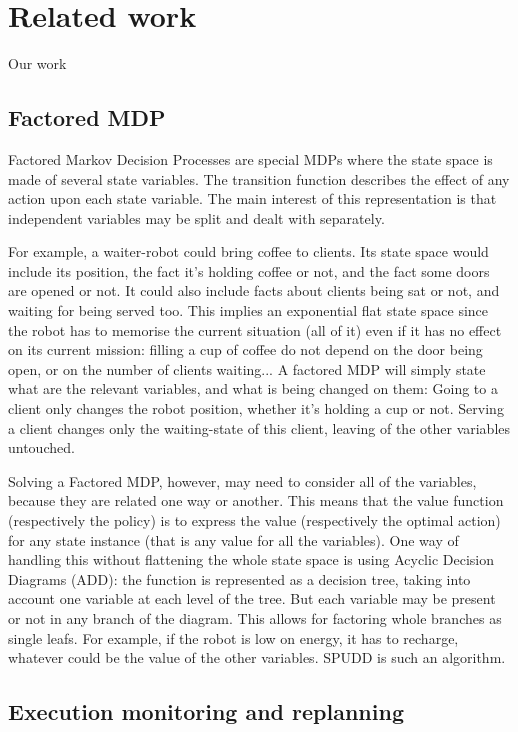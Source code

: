 \section{Related work}


Our work 

\subsection{Factored MDP}

Factored Markov Decision Processes \cite{BoDeGo00} are special MDPs where the state space is made of several state variables. The transition function describes the effect of any action upon each state variable. The main interest of this representation is that independent variables may be split and dealt with separately.

For example, a waiter-robot could bring coffee to clients. Its state space would include its position, the fact it's holding coffee or not, and the fact some doors are opened or not. It could also include facts about clients being sat or not, and waiting for being served too. This implies an exponential flat state space since the robot has to memorise the current situation (all of it) even if it has no effect on its current mission: filling a cup of coffee do not depend on the door being open, or on the number of clients waiting...
A factored MDP will simply state what are the relevant variables, and what is being changed on them: Going to a client only changes the robot position, whether it's holding a cup or not. Serving a client changes only the waiting-state of this client, leaving of the other variables untouched.

Solving a Factored MDP, however, may need to consider all of the variables, because they are related one way or another. This means that the value function (respectively the policy) is to express the value (respectively the optimal action) for any state instance (that is any value for all the variables). One way of handling this without flattening the whole state space is using Acyclic Decision Diagrams (ADD): the function is represented as a decision tree, taking into account one variable at each level of the tree. But each variable may be present or not in any branch of the diagram. This allows for factoring whole branches as single leafs. For example, if the robot is low on energy, it has to recharge, whatever could be the value of the other variables. SPUDD \cite{Hoey99spudd} is such an algorithm. 

\subsection{Execution monitoring and replanning}

